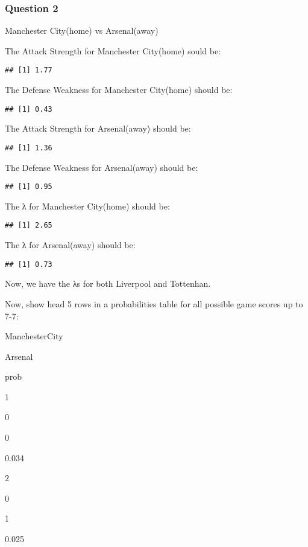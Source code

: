 \documentclass[
]{article}
\begin{document}
\hypertarget{question-2}{%
\subsubsection{Question 2}\label{question-2}}

Manchester City(home) vs Arsenal(away)

The Attack Strength for Manchester City(home) sould be:

\begin{verbatim}
## [1] 1.77
\end{verbatim}

The Defense Weakness for Manchester City(home) should be:

\begin{verbatim}
## [1] 0.43
\end{verbatim}

The Attack Strength for Arsenal(away) should be:

\begin{verbatim}
## [1] 1.36
\end{verbatim}

The Defense Weakness for Arsenal(away) should be:

\begin{verbatim}
## [1] 0.95
\end{verbatim}

The λ for Manchester City(home) should be:

\begin{verbatim}
## [1] 2.65
\end{verbatim}

The λ for Arsenal(away) should be:

\begin{verbatim}
## [1] 0.73
\end{verbatim}

Now, we have the λs for both Liverpool and Tottenhan.

Now, show head 5 rows in a probabilities table for all possible game scores up to 7-7:

ManchesterCity

Arsenal

prob

1

0

0

0.034

2

0

1

0.025
\end{document}
